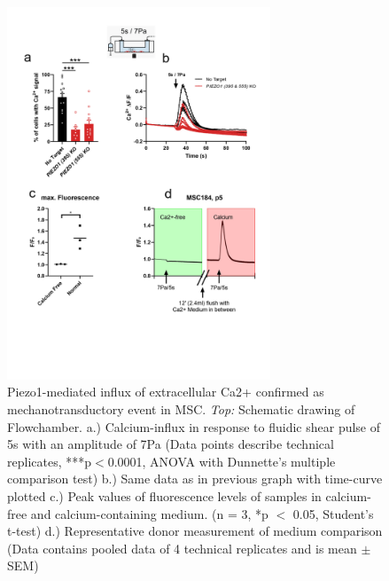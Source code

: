 \begin{figure}
    \centering
    \includegraphics[width = 0.7\textwidth]{Combined_CalciumFree_KnockOut.png}
    \caption{Piezo1-mediated influx of extracellular Ca2+ confirmed as mechanotransductory event in MSC.  \textit{Top:} Schematic drawing of Flowchamber. a.) Calcium-influx in response to fluidic shear pulse of 5s with an amplitude of 7Pa (Data points describe technical replicates, ***p$<$0.0001, ANOVA with Dunnette's multiple comparison test) b.) Same data as in previous graph with time-curve plotted c.) Peak values of fluorescence levels of samples in calcium-free and calcium-containing medium. (n = 3, *p $<$ 0.05, Student's t-test) d.) Representative donor measurement of medium comparison (Data contains pooled data of 4 technical replicates and is mean $\pm$ SEM)}
    \label{fig:Calcium}
\end{figure}

